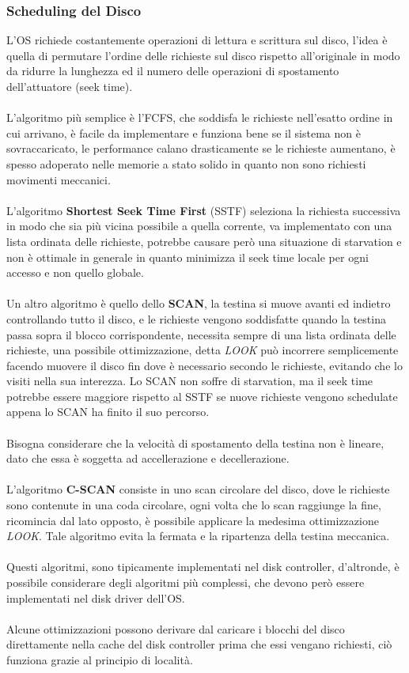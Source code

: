\documentclass[12pt, letterpaper]{article}
\newcommand{\acc}{\\\hphantom{}\\}
\begin{document}
\subsubsection{Scheduling del Disco}
L'OS richiede costantemente operazioni di lettura e scrittura sul disco, l'idea è quella di permutare l'ordine delle 
richieste sul disco rispetto all'originale in modo da ridurre la lunghezza ed il numero delle operazioni di spostamento 
dell'attuatore (seek time). \acc 
L'algoritmo più semplice è l'FCFS, che soddisfa le richieste nell'esatto ordine in cui arrivano, è facile da implementare e 
funziona bene se il sistema non è sovraccaricato, le performance calano drasticamente se le richieste aumentano, è spesso 
adoperato nelle memorie a stato solido in quanto non sono richiesti movimenti meccanici.\acc 
L'algoritmo \textbf{Shortest Seek Time First} (SSTF) seleziona la richiesta successiva in modo che sia più 
vicina possibile a quella corrente, va implementato con una lista ordinata delle richieste, potrebbe causare 
però una situazione di starvation e non è ottimale in generale in quanto minimizza il seek time locale per 
ogni accesso e non quello globale.\acc Un altro algoritmo è quello dello \textbf{SCAN}, la testina si muove avanti ed 
indietro controllando tutto il disco, e le richieste vengono soddisfatte quando la testina passa sopra il blocco 
corrispondente, necessita sempre  di una lista ordinata delle richieste, una possibile ottimizzazione, detta \textit{LOOK} può incorrere semplicemente 
facendo muovere il disco fin dove è necessario secondo le richieste, evitando che lo visiti nella sua interezza. 
Lo SCAN non soffre di starvation, ma il seek time potrebbe essere maggiore rispetto al SSTF se nuove richieste vengono 
schedulate appena lo SCAN ha finito il suo percorso.\acc Bisogna considerare che la velocità di spostamento 
della testina non è lineare, dato che essa è soggetta ad accellerazione e decellerazione.\acc L'algoritmo \textbf{C-SCAN} 
consiste in uno scan circolare del disco, dove le richieste sono contenute in una coda circolare, ogni volta che lo scan 
raggiunge la fine, ricomincia dal lato opposto, è possibile applicare la medesima ottimizzazione \textit{LOOK}. Tale 
algoritmo evita la fermata e la ripartenza della testina meccanica. \acc 
Questi algoritmi, sono tipicamente implementati nel disk controller, d'altronde, è possibile considerare degli 
algoritmi più complessi, che devono però essere implementati nel disk driver dell'OS.\acc Alcune ottimizzazioni 
possono derivare dal caricare i blocchi del disco direttamente nella cache del disk controller prima che essi vengano 
richiesti, ciò funziona grazie al principio di località.
\end{document}
